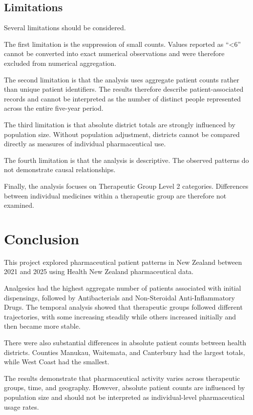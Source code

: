 \documentclass[11pt,a4paper]{report}
\begin{document}
\section{Limitations}

Several limitations should be considered.

The first limitation is the suppression of small counts. Values reported as ``<6'' cannot be converted into exact numerical observations and were therefore excluded from numerical aggregation.

The second limitation is that the analysis uses aggregate patient counts rather than unique patient identifiers. The results therefore describe patient-associated records and cannot be interpreted as the number of distinct people represented across the entire five-year period.

The third limitation is that absolute district totals are strongly influenced by population size. Without population adjustment, districts cannot be compared directly as measures of individual pharmaceutical use.

The fourth limitation is that the analysis is descriptive. The observed patterns do not demonstrate causal relationships.

Finally, the analysis focuses on Therapeutic Group Level 2 categories. Differences between individual medicines within a therapeutic group are therefore not examined.


\chapter{Conclusion}

This project explored pharmaceutical patient patterns in New Zealand between 2021 and 2025 using Health New Zealand pharmaceutical data.

Analgesics had the highest aggregate number of patients associated with initial dispensings, followed by Antibacterials and Non-Steroidal Anti-Inflammatory Drugs. The temporal analysis showed that therapeutic groups followed different trajectories, with some increasing steadily while others increased initially and then became more stable.

There were also substantial differences in absolute patient counts between health districts. Counties Manukau, Waitemata, and Canterbury had the largest totals, while West Coast had the smallest.

The results demonstrate that pharmaceutical activity varies across therapeutic groups, time, and geography. However, absolute patient counts are influenced by population size and should not be interpreted as individual-level pharmaceutical usage rates.
\end{document}
